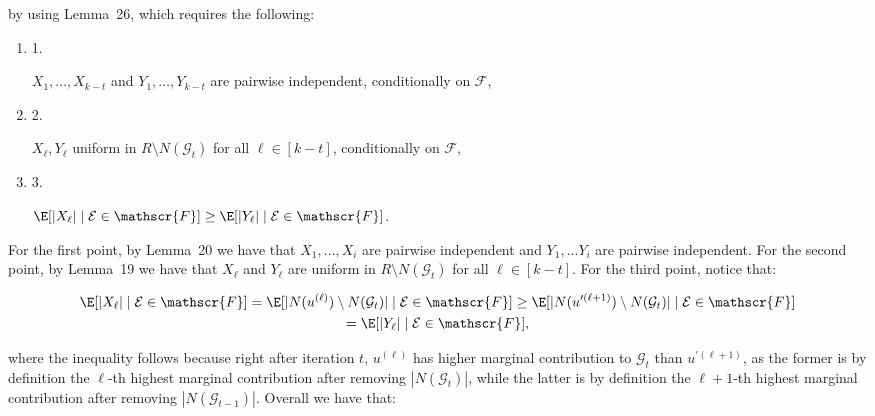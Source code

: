 by using Lemma 26, which requires the following:\par


\begin{enumerate}


\item[] 1. 


$X_{1},\dots,X_{k-t}$ and $Y_{1},\dots,Y_{k-t}$ are pairwise independent, conditionally on $\mathscr{F}$,\par




\item[] 2. 


$X_{\ell},Y_{\ell}$ uniform in $R\setminus N(\mathcal{G}_{t})$ for all $\ell\in[k-t]$, conditionally on $\mathscr{F}$,\par




\item[] 3. 


$\E[|X_{\ell}|\mid\mathcal{E}\in\mathscr{F}]\geq\E[|Y_{\ell}|\mid\mathcal{E}\in\mathscr{F}]$.\par




\end{enumerate}


For the first point, by Lemma 20 we have that $X_{1},\dots,X_{i}$ are pairwise independent and $Y_{1},\dots Y_{i}$ are pairwise independent.
For the second point, by Lemma 19
we have that $X_{\ell}$ and $Y_{\ell}$ are uniform in $R\setminus N(\mathcal{G}_{t})$ for all $\ell\in[k-t]$.
For the third point, notice that:\par


\[\begin{gathered}
\displaystyle\E[|X_{\ell}|\mid\mathcal{E}\in\mathscr{F}]=\E[|N(u^{(\ell)})\setminus N(\mathcal{G}_{t})|\mid\mathcal{E}\in\mathscr{F}] \displaystyle\geq\E[|N(u^{\prime(\ell+1)})\setminus N(\mathcal{G}_{t})|\mid\mathcal{E}\in\mathscr{F}] \\
\displaystyle=\E[|Y_{\ell}|\mid\mathcal{E}\in\mathscr{F}],
\end{gathered}\]


where the inequality follows because right after iteration $t$, $u^{(\ell)}$
has higher marginal contribution to $\mathcal{G}_{t}$ than $u^{\prime(\ell+1)}$, as the former is by definition the $\ell$-th highest marginal contribution after removing $|N(\mathcal{G}_{t})|$, while the latter is by definition the $\ell+1$-th highest marginal contribution after removing $|N(\mathcal{G}_{t-1})|$.
Overall we have that:\par


